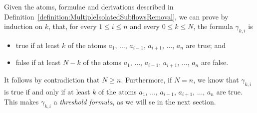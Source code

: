 \begin{remark}\label{remark:FromGammasToThresholds}
Given the atoms, formulae and derivations described in Definition~\vref{definition:MultipleIsolatedSubflowsRemoval}, we can prove by induction on $k$, that, for every $1\le i\le n$ and every $0\le k\le N$, the formula $\gamma_{k,i}$ is
\begin{itemize}
 \item true if at least $k$ of the atoms $a_1$, $\dots$, $a_{i-1}$, $a_{i+1}$, $\dots$, $a_n$ are true; and
 \item false if at least $N-k$ of the atoms $a_1$, $\dots$, $a_{i-1}$, $a_{i+1}$, $\dots$, $a_n$ are false.
\end{itemize}
It follows by contradiction that $N\ge n$. Furthermore, if $N=n$, we know that $\gamma_{k,i}$ is true if and only if at least $k$ of the atoms $a_1$, $\dots$, $a_{i-1}$, $a_{i+1}$, $\dots$, $a_n$ are true. This makes $\gamma_{k,i}$ a \emph{threshold formula}, as we will se in the next section.
\end{remark}

